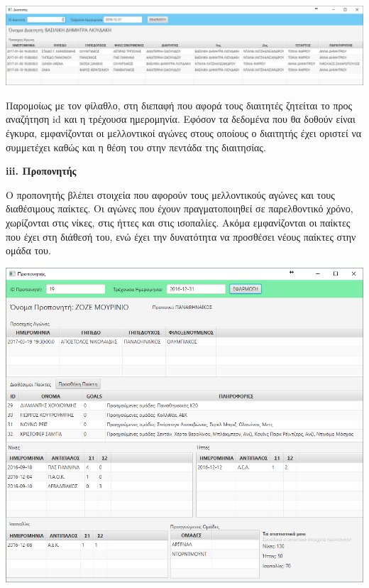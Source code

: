 \documentclass[a4paper,oneside,titlepage,11pt]{article}
\begin{document}
\begin{center}
 \includegraphics[scale=0.45]{screens/3_referee.PNG} 
\end{center} 

\noindent Παρομοίως με τον φίλαθλο, στη διεπαφή που αφορά τους διαιτητές ζητείται το προς αναζήτηση id και η τρέχουσα ημερομηνία. Εφόσον τα δεδομένα που θα δοθούν είναι έγκυρα, εμφανίζονται οι μελλοντικοί αγώνες στους οποίους ο διαιτητής έχει οριστεί να συμμετέχει καθώς και η θέση του στην πεντάδα της διαιτησίας.

\newpage

\noindent\textbf{iii. Προπονητής} 
\vspace{0.3cm}

\noindent Ο προπονητής βλέπει στοιχεία που αφορούν τους μελλοντικούς αγώνες και τους διαθέσιμους παίκτες. Οι αγώνες που έχουν πραγματοποιηθεί σε παρελθοντικό χρόνο, χωρίζονται στις νίκες, στις ήττες και στις ισοπαλίες. Ακόμα εμφανίζονται οι παίκτες που έχει στη διάθεσή του, ενώ έχει την δυνατότητα να προσθέσει νέους παίκτες στην ομάδα του.

\begin{center}
 \includegraphics[scale=0.65]{screens/4_coach.PNG} 
\end{center} 
\end{document}
